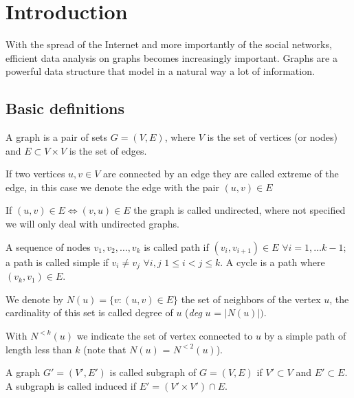 
\chapter{Introduction}

With the spread of the Internet and more importantly of the social networks, efficient data analysis on graphs becomes increasingly important.
Graphs are a powerful data structure that model in a natural way a lot of information.


\section{Basic definitions}

\begin{definizione}\label{def:graph}
    A graph is a pair of sets $G=(V,E)$, where $V$ is the set of vertices (or nodes) and $E \subset V \times V$ is the set of edges.
\end{definizione}

If two vertices $u, v \in V$ are connected by an edge they are called extreme of the edge, in this case we denote the edge with the pair $(u, v) \in E$

If $(u,v) \in E \Leftrightarrow (v,u) \in E$ the graph is called undirected, where not specified we will only deal with undirected graphs.

A sequence of nodes  $v_{1}, v_{2}, \ldots, v_{k}$ is called path if $(v_{i}, v_{i+1}) \in E$ $\forall i = 1, \ldots k-1$; a path is called simple if $v_{i} \neq v_{j}$ $\forall i,j$ $1 \leq i < j \leq k$. A cycle is a path where $(v_{k}, v_{1}) \in E$.

We denote by $N(u) = \{ v : (u,v) \in E \}$ the set of neighbors of the vertex $u$, the cardinality of this set is called degree of $u$ (\textit{deg} $u$ = $|N(u)|)$. 

With $N^{<k}(u)$ we indicate the set of vertex connected to $u$ by a simple path of length less than $k$ (note that $N(u)$ = $N^{<2}(u)$).


\begin{definizione}\label{def:subgraph}
    A graph $G' = (V', E')$ is called subgraph of $G=(V,E)$ if $V' \subset V$ and $E' \subset E$. A subgraph is called induced if $E' = (V' \times V') \cap E$.
\end{definizione}

